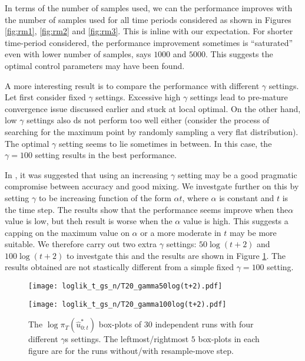 In terms of the number of samples used, we can the performance improves with the number of samples used for all time periods considered as shown in Figures \ref{fig:rm1}, \ref{fig:rm2} and \ref{fig:rm3}. This is inline with our expectation. For shorter time-period considered, the performance improvement sometimes is ``saturated'' even with lower number of samples, says $1000$ and $5000$. This suggests the optimal control parameters may have been found.

A more interesting result is to compare the performance with different $\gamma$ settings. Let first consider fixed $\gamma$ settings. Excessive high $\gamma$ settings lead to pre-mature convergence issue discussed earlier and stuck at local optimal. On the other hand, low $\gamma$ settings also ds not perform too well either (consider the process of searching for the maximum point by randomly sampling a very flat distribution). The optimal $\gamma$ setting seems to lie sometimes in between. In this case, the $\gamma=100$ setting results in the best performance.

In \cite{NK11}, it was suggested that using an increasing $\gamma$ setting may be a good pragmatic compromise between accuracy and good mixing. We investgate further on this by setting $\gamma$ to be increasing function of the form $\alpha t$, where $\alpha$ is constant and $t$ is the time step. The results show that the performance seems improve when the$\alpha$ value is low, but theh result is worse when the $\alpha$ value is high. This suggests a capping on the maximum value on $\alpha$ or a more moderate in $t$ may be more suitable. We therefore carry out two extra $\gamma$ settings: $50\log(t+2)$ and $100\log(t+2)$ to investgate this and the results are shown in Figure \ref{fig:log}. The results obtained are not stastically different from a simple fixed $\gamma=100$ setting.

\begin{figure}[!thbp]
    \centering
    \begin{minipage}{.5\textwidth}
        \centering
        \texttt{[image: loglik\_t\_gs\_n/T20\_gamma50log(t+2).pdf]}
    \end{minipage}%
    \begin{minipage}{0.5\textwidth}
        \centering
        \texttt{[image: loglik\_t\_gs\_n/T20\_gamma100log(t+2).pdf]}
    \end{minipage}
    \caption{The $\log\pi_T(\hat{u}^*_{0:t})$ box-plots of 30 independent runs with four different $\gamma$s settings. The leftmost/rightmost $5$ box-plots in each figure are for the runs without/with resample-move step.}
    \label{fig:log}
\end{figure}

